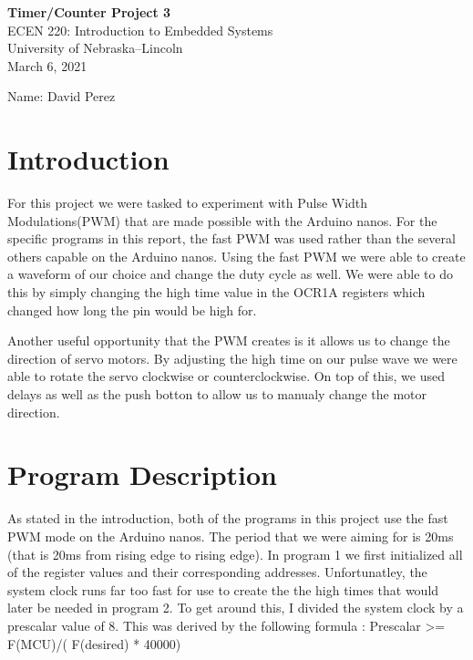 \documentclass[11pt,pdftex,portrait,letterpaper]{article}
\begin{document}
	
	\vspace*{30ex}
	\begin{center}
		
		\textbf{Timer/Counter Project 3}\\
		
		\vspace{4ex}
		ECEN 220: Introduction to Embedded Systems\\
		University of Nebraska--Lincoln\\
		March 6, 2021
		
		\vspace{4ex}
		Name: David Perez\\
		
	\end{center}
	
	
	\pagebreak
	\tableofcontents
	\pagebreak
	
	
	\section{Introduction}
	
	
	For this project we were tasked to experiment with Pulse Width Modulations(PWM) that are made possible with the Arduino nanos. For the specific programs in this report, the fast PWM was used rather than the several others capable on the Arduino nanos. Using the fast PWM we were able to create a waveform of our choice and change the duty cycle as well. We were able to do this by simply changing the high time value in the OCR1A registers which changed how long the pin would be high for.
	
	Another useful opportunity that the PWM creates is it allows us to change the direction of servo motors. By adjusting the high time on our pulse wave we were able to rotate the servo clockwise or counterclockwise. On top of this, we used delays as well as the push botton to allow us to manualy change the motor direction. 	
	

	\section{Program Description}
	
	As stated in the introduction, both of the programs in this project use the fast PWM mode on the Arduino nanos. The period that we were aiming for is 20ms (that is 20ms from rising edge to rising edge). In program 1 we first initialized all of the register values and their corresponding addresses. Unfortunatley, the system clock runs far too fast for use to create the the high times that would later be needed in program 2. To get around this, I divided the system clock by a prescalar value of 8. This was derived by the following formula : Prescalar >= F(MCU)/( F(desired) * 40000)
	
\end{document}
